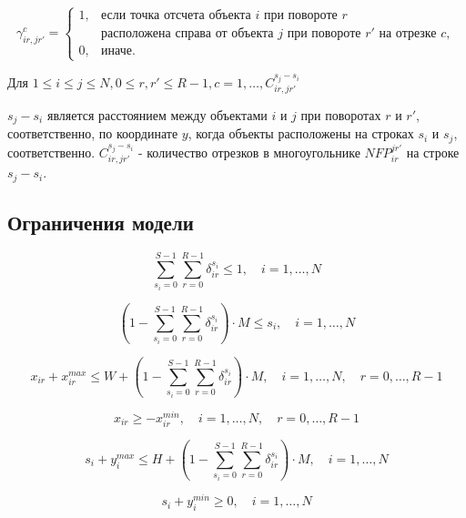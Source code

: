 \documentclass[a4paper]{article}
\begin{document}
    
    \[
    \gamma_{ir,jr'}^{c} = 
     \begin{cases}
    1, & \text{если точка отсчета объекта $i$ при повороте $r$}\\ & \text{расположена справа от объекта $j$ при повороте $r'$ на отрезке $c$},\\
    0, & \text{иначе.}
    \end{cases}
    \]
    
    Для $1 \leq i \leq j \leq N, 0 \leq r,r' \leq R - 1, c = 1,\ldots,C_{ir,jr'}^{s_j-s_i}$
    
    $s_j-s_i$ является расстоянием между объектами $i$ и $j$ при поворотах $r$ и $r'$, соответственно, по координате $y$, когда объекты расположены на строках $s_i$ и $s_j$, соответственно. $C_{ir,jr'}^{s_j-s_i}$ - количество отрезков в многоугольнике $NFP_{ir}^{jr'}$ на строке $s_j-s_i$.

	\subsection{Ограничения модели}
    
    \begin{equation}
    \sum_{s_i=0}^{S - 1 } \sum_{r=0}^{R - 1} \delta_{ir}^{s_i} \leq 1, \quad i = 1,\ldots,N
    \end{equation}
    
    \begin{equation}
    (1 - \sum_{s_i= 0 }^{S - 1} \sum_{r=0}^{R - 1} \delta_{ir}^{s_i}) \cdot M \leq s_i, \quad i = 1,\ldots,N
    \end{equation}
    
    \begin{equation}
    x_{ir} + x_{ir}^{max} \leq W + (1 - \sum_{s_i=0}^{S - 1} \sum_{r= 0}^{R - 1} \delta_{ir}^{s_i}) \cdot M, \quad i = 1,\ldots,N, \quad r = 0,\ldots,R-1
    \end{equation}
    
    \begin{equation}
    x_{ir} \geq -x_{ir}^{min}, \quad i = 1,\ldots,N, \quad r = 0,\ldots,R-1
    \end{equation}
        
    \begin{equation}
    s_i + y_i^{max} \leq H + (1 - \sum_{s_i=0}^{S - 1} \sum_{r=0}^{R - 1} \delta_{ir}^{s_i}) \cdot M, \quad i = 1,\ldots,N
    \end{equation}

    \begin{equation}
    s_i + y_i^{min} \geq 0, \quad i = 1,\ldots,N
    \end{equation}
        
\end{document}
